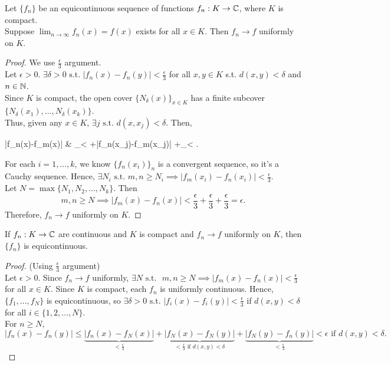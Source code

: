 \begin{problem}[7.16]
Let $\{f_n\}$ be an equicontinuous sequence of functions $f_n:K\to \mathbb{C}$, where $K$ is compact.\\
Suppose $\lim_{n\to \infty}{f_n(x)}=f(x)$ exists for all $x \in K$. Then $f_n\to f$ uniformly on $K$.
\begin{proof}
	We use $\frac{\epsilon}{3}$ argument.\\
	Let $\epsilon>0$. $\exists{\delta > 0} \text{ s.t. } \left|f_n(x)-f_n(y)\right| <\frac{\epsilon}{3}$ for all $x,y \in K$ s.t. $d(x,y)<\delta$ and $n \in \mathbb{N}$.\\
	Since $K$ is compact, the open cover $\{N_{\delta}(x)\}_{x \in K}$ has a finite subcover $\{N_{\delta}(x_1),\ldots,N_{\delta}(x_k)\}$.\\
	Thus, given any $x \in K$, $\exists j \text{ s.t. } d(x,x_j)<\delta$. Then,
	\begin{flalign*}
		\left|f_n(x)-f_m(x)\right| & \le {}_{<} +\left|f_n(x_j)-f_m(x_j)\right| +_{<}
		.\end{flalign*}
	For each $i=1,\ldots ,k$, we know $\{f_n(x_i)\}_n$ is a convergent sequence, so it's a Cauchy sequence. Hence, $\exists{N_i} \text{ s.t. } m,n\ge N_i\implies \left|f_m(x_i)-f_n(x_i)\right|<\frac{\epsilon}{3}$.\\
	Let $N=\max\{N_1,N_2,\ldots ,N_k\} $. Then \[
		m,n\ge N\implies \left|f_m(x)-f_n(x)\right| <\frac{\epsilon}{3}+\frac{\epsilon}{3}+\frac{\epsilon}{3} =\epsilon
		.\]
	Therefore, $f_{n}\to f$ uniformly on $K$.
\end{proof}
\end{problem}


\begin{thm}[24]
	If $f_{n}: K\to \mathbb{C}$ are continuous and $K$ is compact and $f_{n}\to f$ uniformly on $K$, then $\{f_{n}\}$ is equicontinuous.
	\begin{proof}
		(Using $\frac{\epsilon}{3}$ argument)\\
		Let $\epsilon>0$. Since $f_{n}\to f$ uniformly, $\exists{N} \text{ s.t. } $ $m,n\ge N \implies \left|f_{m}(x)-f_{n}(x)\right|<\frac{\epsilon}{3}$  for all $x \in K$. Since $K$ is compact, each $f_{n}$ is uniformly continuous.
		Hence, $\{f_1,\ldots ,f_{N}\} $ is equicontinuous, so $\exists{\delta >0} \text{ s.t. } \left|f_{i}(x)-f_{i}(y)\right| <\frac{\epsilon}{3}$ if $d(x,y)<\delta$ for all $i \in \{1,2,\ldots ,N\}$.\\
		For $n\ge N$,
		\[
			\left| f_{n}(x)-f_{n}(y)\right| \le \underbrace{\left|f_{n}(x)-f_{N}(x)\right|} _{<\frac{\epsilon}{3}}+ \underbrace{\left|f_N(x)-f_N(y)\right|}_{<\frac{\epsilon}{3} \text{ if } d(x,y)<\delta}+\underbrace{\left|f_N(y)-f_n(y)\right|}_{<\frac{\epsilon}{3}}<\epsilon \text{ if } d(x,y)<\delta
			.\]
	\end{proof}
\end{thm}

